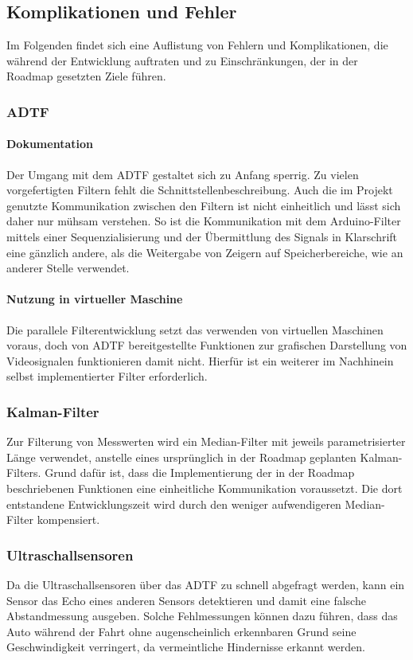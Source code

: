 \documentclass[12pt, a4paper]{scrartcl}
\begin{document}
\subsection{Komplikationen und Fehler}
Im Folgenden findet sich eine Auflistung von Fehlern und Komplikationen, die während der Entwicklung auftraten und zu Einschränkungen, der in der Roadmap gesetzten Ziele führen.

\subsubsection{ADTF}
\paragraph{Dokumentation}
Der Umgang mit dem ADTF gestaltet sich zu Anfang sperrig. Zu vielen vorgefertigten Filtern fehlt die Schnittstellenbeschreibung. Auch die im Projekt genutzte Kommunikation zwischen den Filtern ist nicht einheitlich und lässt sich daher nur mühsam verstehen. So ist die Kommunikation mit dem Arduino-Filter mittels einer Sequenzialisierung und der Übermittlung des Signals in Klarschrift eine gänzlich andere, als die Weitergabe von Zeigern auf Speicherbereiche, wie an anderer Stelle verwendet.

\paragraph{Nutzung in virtueller Maschine}
Die parallele Filterentwicklung setzt das verwenden von virtuellen Maschinen voraus, doch von ADTF bereitgestellte Funktionen zur grafischen Darstellung von Videosignalen funktionieren damit nicht. Hierfür ist ein weiterer im Nachhinein selbst implementierter Filter erforderlich.

\subsubsection{Kalman-Filter}
Zur Filterung von Messwerten wird ein Median-Filter mit jeweils parametrisierter Länge verwendet, anstelle eines ursprünglich in der Roadmap geplanten Kalman-Filters. Grund dafür ist, dass die Implementierung der in der Roadmap beschriebenen Funktionen eine einheitliche Kommunikation voraussetzt. Die dort entstandene Entwicklungszeit wird durch den weniger aufwendigeren Median-Filter kompensiert.

\subsubsection{Ultraschallsensoren}
Da die Ultraschallsensoren über das ADTF zu schnell abgefragt werden, kann ein Sensor das Echo eines anderen Sensors detektieren und damit eine falsche Abstandmessung ausgeben. Solche Fehlmessungen können dazu führen, dass das Auto während der Fahrt ohne augenscheinlich erkennbaren Grund seine Geschwindigkeit verringert, da vermeintliche Hindernisse erkannt werden.
\end{document}

